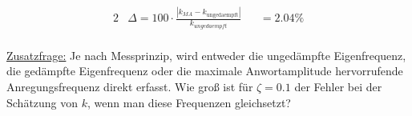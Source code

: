 \begin{questions}
    \begin{solution}
        \begin{alignat*}{2}
            &\Delta = 100 \cdot \frac{|k_{MA} - k_\mathrm{ungedaempft}|}{k_{ungedaempft}} &&= 2.04 \% \\ 
        \end{alignat*}
    \end{solution}


    \underline{Zusatzfrage:} Je nach Messprinzip, wird entweder die ungedämpfte
    Eigenfrequenz, die gedämpfte Eigenfrequenz oder die maximale Anwortamplitude
    hervorrufende Anregungsfrequenz direkt erfasst. Wie groß ist für $\zeta = 0.1$ der
    Fehler bei der Schätzung von $k$, wenn man diese Frequenzen gleichsetzt?


\end{questions}
